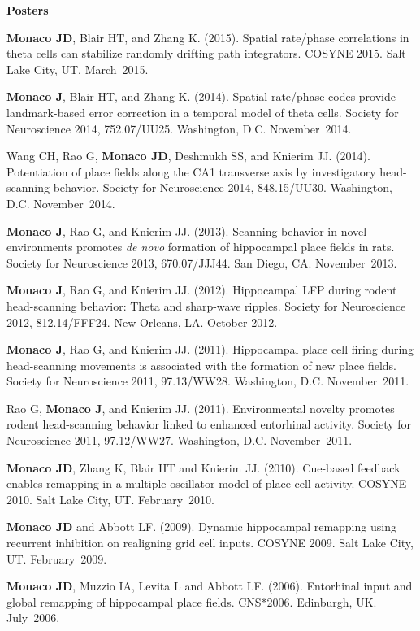\documentclass[10pt]{article}
\begin{document}
\begin{description}
\item \textbf{Posters}
\item[\quad] \textbf{Monaco JD}, Blair HT, and Zhang K. (2015). Spatial rate/phase correlations in theta cells can stabilize randomly drifting path integrators. COSYNE 2015. Salt Lake City, UT. March~2015.
\item[\quad] \textbf{Monaco J}, Blair HT, and Zhang K. (2014). Spatial rate/phase codes provide landmark-based error correction in a temporal model of theta cells. Society for Neuroscience 2014, 752.07/UU25. Washington, D.C. November~2014.
\item[\quad] Wang CH, Rao G, \textbf{Monaco JD}, Deshmukh SS, and Knierim JJ. (2014). Potentiation of place fields along the CA1 transverse axis by investigatory head-scanning behavior. Society for Neuroscience 2014, 848.15/UU30. Washington, D.C. November~2014.
\item[\quad] \textbf{Monaco J}, Rao G, and Knierim JJ. (2013). Scanning behavior in novel environments promotes \emph{de novo} formation of hippocampal place fields in rats. Society for Neuroscience 2013, 670.07/JJJ44. San Diego, CA. November~2013.
\item[\quad] \textbf{Monaco J}, Rao G, and Knierim JJ. (2012). Hippocampal LFP during rodent head-scanning behavior: Theta and sharp-wave ripples. Society for Neuroscience 2012, 812.14/FFF24. New Orleans, LA. October 2012.
\item[\quad] \textbf{Monaco J}, Rao G, and Knierim JJ. (2011). Hippocampal place cell firing during head-scanning movements is associated with the formation of new place fields. Society for Neuroscience 2011, 97.13/WW28. Washington, D.C. November~2011.
\item[\quad] Rao G, \textbf{Monaco J}, and Knierim JJ. (2011). Environmental novelty promotes rodent head-scanning behavior linked to enhanced entorhinal activity. Society for Neuroscience 2011, 97.12/WW27. Washington, D.C. November~2011.
\item[\quad] \textbf{Monaco JD}, Zhang K, Blair HT and Knierim JJ. (2010). Cue-based feedback enables remapping in a multiple oscillator model of place cell activity. COSYNE 2010. Salt Lake City, UT. February~2010.
\item[\quad] \textbf{Monaco JD} and Abbott LF. (2009). Dynamic hippocampal remapping using recurrent inhibition on realigning grid cell inputs. COSYNE 2009. Salt Lake City, UT. February~2009.
\item[\quad] \textbf{Monaco JD}, Muzzio IA, Levita L and Abbott LF. (2006). Entorhinal input and global remapping of hippocampal place fields. CNS*2006. Edinburgh, UK. July~2006.

\end{description}
\end{document}
